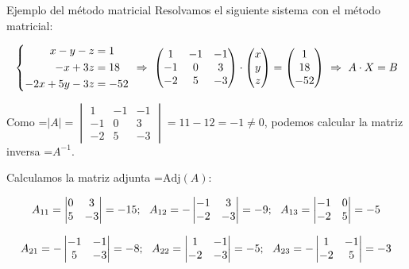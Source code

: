 \documentclass[11pt,a4paper]{article}
\newcommand{\fmm}[1]{\setbox0=\hbox{$#1$}\ifdim\wd0>\linewidth\fmdisp{#1}\else\mbox{\box0}\fi}
\newcommand{\fmdisp}[1]{\[\setbox2=\hbox{$\displaystyle #1$}\ifdim\wd2>\linewidth\resizebox{\linewidth}{!}{\box2}\else\box2\fi\]}
\begin{document}
\begin{fmex}{Ejemplo del método matricial}
Resolvamos el siguiente sistema con el método matricial:

\fmdisp{\left\{\begin{aligned}x-y-z&=1\\ -x+3z&=18\\ -2x+5y-3z&=-52\end{aligned}\right.\ \Rightarrow\ \begin{pmatrix}1 & -1 & -1\\ -1 & 0 & 3\\ -2 & 5 & -3\end{pmatrix}\cdot\begin{pmatrix}x\\ y\\ z\end{pmatrix}=\begin{pmatrix}1\\ 18\\ -52\end{pmatrix}\ \Rightarrow\ A\cdot X=B}

Como \fmm{|A|=\begin{vmatrix}1 & -1 & -1\\ -1 & 0 & 3\\ -2 & 5 & -3\end{vmatrix}=11-12=-1\neq0}, podemos calcular la matriz inversa \fmm{A^{-1}}.

Calculamos la matriz adjunta \fmm{\mathrm{Adj}(A)}:

\fmdisp{A_{11}=\begin{vmatrix}0 & 3\\ 5 & -3\end{vmatrix}=-15;\ \ A_{12}=-\begin{vmatrix}-1 & 3\\ -2 & -3\end{vmatrix}=-9;\ \ A_{13}=\begin{vmatrix}-1 & 0\\ -2 & 5\end{vmatrix}=-5}

\fmdisp{A_{21}=-\begin{vmatrix}-1 & -1\\ 5 & -3\end{vmatrix}=-8;\ \ A_{22}=\begin{vmatrix}1 & -1\\ -2 & -3\end{vmatrix}=-5;\ \ A_{23}=-\begin{vmatrix}1 & -1\\ -2 & 5\end{vmatrix}=-3}


\end{fmex}
\end{document}
